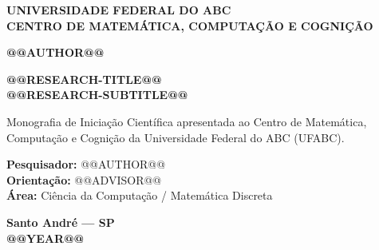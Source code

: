 \thispagestyle{empty}

\begin{center}
    {\large\textbf{UNIVERSIDADE FEDERAL DO ABC}}\\[0.2cm]
    {\large\textbf{CENTRO DE MATEMÁTICA, COMPUTAÇÃO E COGNIÇÃO}}
\end{center}

\vfill

\begin{center}
    {\Large\textbf{@@AUTHOR@@}}
\end{center}

\vfill

\begin{center}
    {\fontsize{22}{27}\selectfont\textbf{@@RESEARCH-TITLE@@}}\\[0.35cm]
    {\fontsize{17}{22}\selectfont\textbf{@@RESEARCH-SUBTITLE@@}}\par
\end{center}

\vfill

\begin{flushright}
\begin{minipage}{0.58\textwidth}
\small
{}
Monografia de Iniciação Científica apresentada ao Centro de Matemática, Computação e Cognição da Universidade Federal do ABC (UFABC).\par
\vspace{0.45cm}
\textbf{Pesquisador:} @@AUTHOR@@\\
\textbf{Orientação:} @@ADVISOR@@\\
\textbf{Área:} Ciência da Computação / Matemática Discreta
\end{minipage}
\end{flushright}

\vfill

\begin{center}
    \textbf{Santo André --- SP}\\
    \textbf{@@YEAR@@}
\end{center}

\newpage
